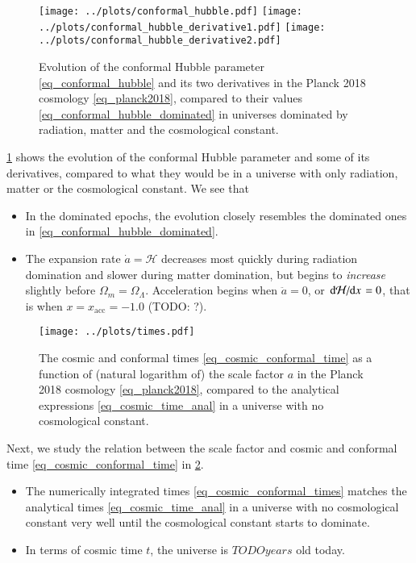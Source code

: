 \documentclass{aa}
\begin{document}
\begin{figure}
	\centering
	\texttt{[image: ../plots/conformal\_hubble.pdf]}
	\texttt{[image: ../plots/conformal\_hubble\_derivative1.pdf]}
	\texttt{[image: ../plots/conformal\_hubble\_derivative2.pdf]}
	\caption{Evolution of the conformal Hubble parameter \eqref{eq_conformal_hubble} and its two derivatives in the Planck 2018 cosmology \eqref{eq_planck2018}, compared to their values \eqref{eq_conformal_hubble_dominated} in universes dominated by radiation, matter and the cosmological constant.}
	\label{fig_conformal_hubble}
\end{figure}

\cref{fig_conformal_hubble} shows the evolution of the conformal Hubble parameter and some of its derivatives,
compared to what they would be in a universe with only radiation, matter or the cosmological constant.
We see that
\begin{itemize}
	\item In the dominated epochs, the evolution closely resembles the dominated ones in \eqref{eq_conformal_hubble_dominated}.
	\item The expansion rate $\dot{a} = \mathcal{H}$ decreases most quickly during radiation domination and slower during matter domination,
	      but begins to \emph{increase} slightly before $\Omega_m = \Omega_\Lambda$.
		  Acceleration begins when $\ddot{a}=0$, or $\odv{\mathcal{H}}/{x} = 0$, that is when $x = x_\text{acc} = -1.0$ (TODO: ?).
\end{itemize}

\begin{figure}
	\centering
	\texttt{[image: ../plots/times.pdf]}
	\caption{The cosmic and conformal times \eqref{eq_cosmic_conformal_time} as a function of (natural logarithm of) the scale factor $a$ in the Planck 2018 cosmology \eqref{eq_planck2018}, compared to the analytical expressions \eqref{eq_cosmic_time_anal} in a universe with no cosmological constant.}
	\label{fig_cosmic_conformal_time}
\end{figure}

Next, we study the relation between the scale factor and cosmic and conformal time \eqref{eq_cosmic_conformal_time} in \cref{fig_cosmic_conformal_time}.
\begin{itemize}
	\item The numerically integrated times \eqref{eq_cosmic_conformal_times} matches the analytical times \eqref{eq_cosmic_time_anal} in a universe with no cosmological constant very well until the cosmological constant starts to dominate.
	\item In terms of cosmic time $t$, the universe is $TODO years$ old today.
\end{itemize}
\end{document}
